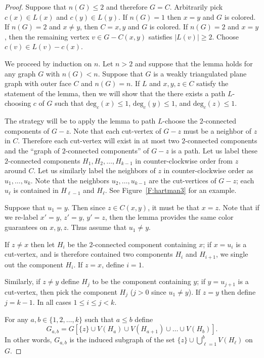 \documentclass[12pt,letterpaper]{article}
\theoremstyle{plain}
\theoremstyle{definition}
\theoremstyle{break}
\begin{document}
\begin{proof}
Suppose that $n(G)\le 2$ and therefore $G=C$.
Arbitrarily pick $c(x)\in L(x)$ and $c(y)\in L(y)$.
If $n(G)=1$ then $x=y$ and $G$ is colored.
If $n(G)= 2$ and $x\ne y$, then $C=x,y$ and $G$ is colored.
If $n(G)=2$ and $x=y$, then the remaining vertex
$v\in G-C(x,y)$ satisfies $|L(v)|\ge 2$. Choose $c(v)\in L(v)-c(x)$.

We proceed by induction on $n$. Let $n>2$ and suppose that the lemma
holds for any graph $G$ with $n(G)<n$.
Suppose that $G$ is a weakly triangulated plane graph with outer face $C$ and
$n(G)=n$. If $L$ and $x,y,z\in C$
satisfy the statement of the lemma, then we will show that
the there exists a path $L$-choosing $c$ of $G$ such that
$\text{deg}_c(x)\le 1$, $\text{deg}_c(y)\le 1$, and $\text{deg}_c(z)\le 1$.

The strategy will be to apply the lemma
to path $L$-choose the $2$-connected components of $G-z$.
Note that each cut-vertex of $G-z$
must be a neighbor of $z$ in $C$. Therefore each cut-vertex will
exist in at most
two $2$-connected components and the ``graph of $2$-connected
components'' of $G-z$ is a path. Let us label these
$2$-connected components $H_1,H_2,\ldots,H_{k-1}$ in counter-clockwise
order from $z$ around $C$. Let us similarly label the neighbors
of $z$ in counter-clockwise order as $u_1,\ldots,u_{k}$. Note that
the neighbors $u_2,\ldots,u_{k-1}$ are the cut-vertices of $G-z$; each
$u_\ell$ is contained in $H_{\ell-1}$ and $H_{\ell}$. See
Figure~\ref{F:hartman3} for an example.

Suppose that $u_1=y$. Then since $z\in C(x,y)$, it must be that $x=z$.
Note that if we re-label $x'=y$, $z'=y$, $y'=z$, then the lemma provides the
same color guarantees on $x,y,z$. Thus assume that $u_1\ne y$.

If $z\ne x$ then let $H_i$ be the $2$-connected
component containing $x$; if $x=u_i$ is a cut-vertex, and is therefore
contained two components $H_i$ and $H_{i+1}$, we
single out the component $H_i$.
If $z=x$, define $i=1$.

Similarly, if $z\ne y$ define $H_j$ to be the
component containing $y$; if $y=u_{j+1}$ is a cut-vertex, then pick
the component $H_j$ ($j>0$ since $u_1\ne y$).
If $z = y$ then define $j=k-1$. In all cases $1\le i\le j< k$.

For any $a,b\in\{1,2,\ldots,k\}$
such that $a\le b$ define
$$ G_{a,b}=G\left[\{z\}\cup V(H_a)\cup V(H_{a+1})\cup \ldots\cup V(H_b)\right].$$ 
In other words, $G_{a,b}$ is the induced subgraph of the set
$\{z\}\cup \bigcup_{\ell=1}^bV(H_\ell)$ on $G$.


\end{proof}
\end{document}
